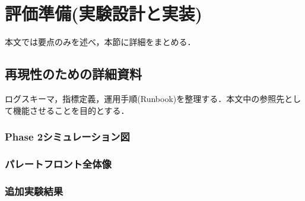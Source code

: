 ﻿%

\section{評価準備(実験設計と実装)}
\label{sec:eval_preparation}
本文では要点のみを述べ，本節に詳細をまとめる．

\begingroup
  \let\section\subsection
  \let\subsection\subsubsection
  
  
\endgroup

\section{再現性のための詳細資料}
\label{sec:repro_details}
ログスキーマ，指標定義，運用手順(Runbook)を整理する．本文中の参照先として機能させることを目的とする．

\begingroup
  \let\section\subsection
  \let\subsection\subsubsection
  
  
  
\endgroup

\section{Phase 2シミュレーション図}
\label{sec:phase2_figs_detail}



\section{パレートフロント全体像}
\label{sec:pareto_full}



\section{追加実験結果}
\label{sec:extra_results}




